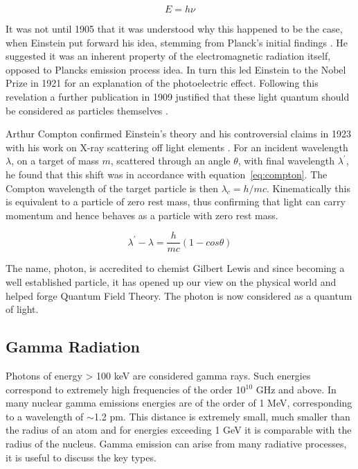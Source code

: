 \begin{equation}
E = h\nu
\label{eq:photonEnergy}
\end{equation}

It was not until 1905 that it was understood why this happened to be the case, when Einstein put forward his idea, stemming from Planck's initial findings \cite{einsteinQuanta}. He suggested it was an inherent property of the electromagnetic radiation itself, opposed to Plancks emission process idea. In turn this led Einstein to the Nobel Prize in 1921 for an explanation of the photoelectric effect. Following this revelation a further publication in 1909 justified that these light quantum should be considered as particles themselves \cite{einsteinPhoton}. 


Arthur Compton confirmed Einstein's theory and his controversial claims in 1923 with his work on X-ray scattering off light elements \cite{compton}. For an incident wavelength $\lambda$, on a target of mass $m$, scattered through an angle $\theta$, with final wavelength $\lambda^{'}$, he found that this shift was in accordance with equation~\ref{eq:compton}. The Compton wavelength of the target particle is then $\lambda_{c} = h/mc$. Kinematically this is equivalent to a particle of zero rest mass, thus confirming that light can carry momentum and hence behaves as a particle with zero rest mass.

\begin{equation}
\lambda^{'} - \lambda =  \frac {h}{mc} (1 - cos\theta)
\label{eq:compton}
\end{equation}
 
The name, photon, is accredited to chemist Gilbert Lewis \cite{photonName} and since becoming a well established particle, it has opened up our view on the physical world and helped forge Quantum Field Theory. The photon is now considered as a quantum of light.
 
\subsection{Gamma Radiation}
Photons of energy > 100 keV are considered gamma rays. Such energies correspond to extremely high frequencies of the order 10$^{10}$ GHz and above. In many nuclear gamma emissions energies are of the order of 1 MeV, corresponding to a wavelength of $\sim$1.2 pm. This distance is extremely small, much smaller than the radius of an atom and for energies exceeding 1 GeV it is comparable with the radius of the nucleus. Gamma emission can arise from many radiative processes, it is useful to discuss the key types.

